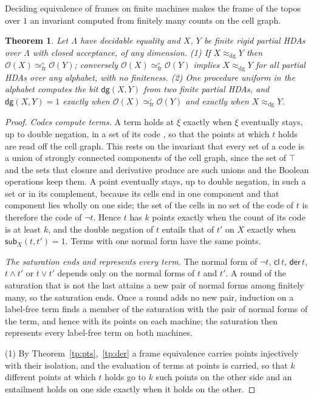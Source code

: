 \documentclass{lmcs}
\newtheorem{theorem}{Theorem}[section]
\theoremstyle{definition}
\theoremstyle{remark}
\newcommand{\Op}{\mathcal{O}}
\newcommand{\eqFrF}{\simeq^{\circ}_{\mathrm{fr}}}
\providecommand{\tcl}{\mathsf{cl}}
\providecommand{\tder}{\mathsf{der}}
\providecommand{\eqDg}{\approx_{\mathrm{dg}}}
\providecommand{\dgB}{\mathsf{dg}}
\begin{document}
Deciding equivalence of frames on finite machines makes the frame of the topos over $1$ an invariant computed from
finitely many counts on the cell graph.

\begin{theorem}\label{thm:dec-decide}
Let $\Lambda$ have decidable equality and $X$, $Y$ be finite rigid partial HDAs over $\Lambda$ with closed acceptance,
of any dimension.
(1) If $X\eqDg Y$ then $\Op(X)\eqFrF\Op(Y)$; conversely $\Op(X)\eqFrF\Op(Y)$ implies
$X\eqDg Y$ for all partial HDAs over any alphabet, with no finiteness. (2) One
procedure uniform in the alphabet computes the bit $\dgB(X,Y)$ from two finite partial HDAs, and $\dgB(X,Y)=1$ exactly
when $\Op(X)\eqFrF\Op(Y)$ and exactly when $X\eqDg Y$.
\end{theorem}

\begin{proof}
\emph{Codes compute terms.} A term holds at $\xi$ exactly when $\xi$ eventually stays, up to double negation, in a
set of its code \cite{Head86}, so that the points at which $t$ holds are read off the cell
graph. This rests on the invariant that every set of a code is a union of strongly connected components of the cell
graph, since the set of $\top$ and the sets that closure and derivative produce are such unions and the Boolean
operations keep them. A point eventually stays, up to double
negation, in such a set or in its complement, because its cells end in one component and that component lies wholly
on one side; the set of the cells in no set of the code of $t$ is therefore the code of
$\neg t$. Hence $t$ has $k$ points exactly when the count of its code is at least $k$, and the
double negation of $t$ entails that of $t'$ on $X$ exactly when $\mathsf{sub}_X(t,t')=1$.
Terms with one normal form have the same points.

\emph{The saturation ends and represents every term.} The normal form of $\neg t$, $\tcl\,t$, $\tder\,t$, $t\wedge t'$
or $t\vee t'$ depends only on the normal forms of $t$ and $t'$. A round of the saturation that is not the
last attains a new pair of normal forms among finitely many, so the saturation ends.
Once a round adds no new pair, induction on a label-free term finds a member of the saturation with the pair of normal
forms of the term, and hence with its points on each machine; the saturation then represents every label-free term
on both machines.

(1) By Theorem~\ref{tp:pts},~\ref{tp:der} a frame equivalence carries points injectively with their isolation, and
the evaluation of terms at points is carried, so that
$k$ different points at which $t$ holds go to $k$ such points on the other side and an entailment holds on one side
exactly when it holds on the other.


\end{proof}
\end{document}
